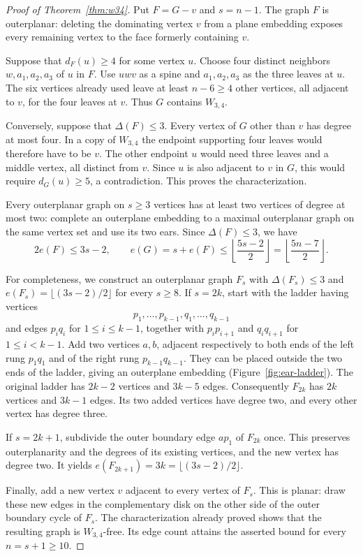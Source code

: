 \documentclass[11pt,a4paper]{article}
\theoremstyle{remark}
\begin{document}
\begin{proof}[Proof of Theorem~\ref{thm:w34}]
Put $F=G-v$ and $s=n-1$. The graph $F$ is outerplanar: deleting the
dominating vertex $v$ from a plane embedding exposes every remaining
vertex to the face formerly containing $v$.

Suppose that $d_F(u)\ge4$ for some vertex $u$. Choose four distinct
neighbors $w,a_1,a_2,a_3$ of $u$ in $F$. Use $uwv$ as a spine and
$a_1,a_2,a_3$ as the three leaves at $u$. The six vertices already used
leave at least $n-6\ge4$ other vertices, all adjacent to $v$, for the
four leaves at $v$. Thus $G$ contains $W_{3,4}$.

Conversely, suppose that $\Delta(F)\le3$. Every vertex of $G$ other
than $v$ has degree at most four. In a copy of $W_{3,4}$ the endpoint
supporting four leaves would therefore have to be $v$. The other
endpoint $u$ would need three leaves and a middle vertex, all distinct
from $v$. Since $u$ is also adjacent to $v$ in $G$, this would require
$d_G(u)\ge5$, a contradiction. This proves the characterization.

Every outerplanar graph on $s\ge3$ vertices has at least two vertices
of degree at most two: complete an outerplane embedding to a maximal
outerplanar graph on the same vertex set and use its two ears. Since
$\Delta(F)\le3$, we have
\[
2e(F)\le3s-2,
\qquad
e(G)=s+e(F)\le\left\lfloor\frac{5s-2}{2}\right\rfloor
=\left\lfloor\frac{5n-7}{2}\right\rfloor.
\]

For completeness, we construct an outerplanar graph $F_s$ with
$\Delta(F_s)\le3$ and $e(F_s)=\lfloor(3s-2)/2\rfloor$ for every
$s\ge8$. If $s=2k$, start with the ladder having vertices
\[
p_1,\ldots,p_{k-1},q_1,\ldots,q_{k-1}
\]
and edges $p_iq_i$ for $1\le i\le k-1$, together with
$p_ip_{i+1}$ and $q_iq_{i+1}$ for $1\le i<k-1$. Add two vertices
$a,b$, adjacent respectively to both ends of the left rung
$p_1q_1$ and of the right rung $p_{k-1}q_{k-1}$. They can be placed
outside the two ends of the ladder, giving an outerplane embedding
(Figure~\ref{fig:ear-ladder}). The original ladder has $2k-2$ vertices
and $3k-5$ edges. Consequently $F_{2k}$ has $2k$ vertices and $3k-1$
edges. Its two added vertices have degree two, and every other vertex
has degree three.

If $s=2k+1$, subdivide the outer boundary edge $ap_1$ of $F_{2k}$
once. This preserves outerplanarity and the degrees of its existing
vertices, and the new vertex has degree two. It yields
$e(F_{2k+1})=3k=\lfloor(3s-2)/2\rfloor$.

Finally, add a new vertex $v$ adjacent to every vertex of $F_s$.
This is planar: draw these new edges in the complementary disk on
the other side of the outer boundary cycle of $F_s$. The
characterization already proved shows that the resulting graph is
$W_{3,4}$-free. Its edge count attains the asserted bound for every
$n=s+1\ge10$.
\end{proof}
\end{document}
